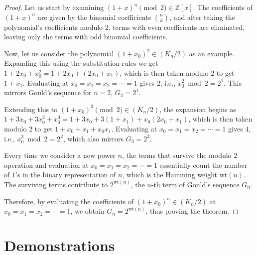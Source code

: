 \documentclass{article}
\theoremstyle{plain}
\theoremstyle{definition}
\newcommand{\Z}{\mathbb{Z}}
\newcommand{\K}{K}
\newcommand{\wt}[1]{\text{wt}(#1)}
\begin{document}
\begin{proof}
Let us start by examining $ (1+x)^n \pmod{2} \in \Z[x]$. The coefficients of $(1+x)^n$ are given by the binomial coefficients $\binom{n}{k}$, and after taking the polynomial's coefficients modulo $2$, terms with even coefficients are eliminated, leaving only the terms with odd binomial coefficients.

Now, let us consider the polynomial $(1+x_0)^2 \in (\K_n/2)$ as an example. Expanding this using the substitution rules we get $1 + 2x_0 + x_0^2 = 1 + 2x_0 + (2x_0 + x_1)$, which is then taken modulo $2$ to get $1 + x_1$. Evaluating at $x_0=x_1=x_2=\cdots=1$ gives $2$, i.e., $x_0^2 \bmod 2 = 2^1$. This mirrors Gould's sequence for $n = 2$, $G_2 = 2^1$.

Extending this to $(1+x_0)^3 \pmod{2} \in (\K_n/2)$, the expansion begins as $1 + 3x_0 + 3x_0^2 + x_0^3 = 1 + 3x_0 + 3(1+x_1) + x_0(2x_0+x_1)$, which is then taken modulo $2$ to get $1 + x_0 + x_1 + x_0 x_1$. Evaluating at $x_0=x_1=x_2=\cdots=1$ gives $4$, i.e., $x_0^3 \bmod 2 = 2^2$, which also mirrors $G_3 = 2^2$.

Every time we consider a new power $n$, the terms that survive the modulo $2$ operation and evaluation at $x_0=x_1=x_2=\cdots=1$ essentially count the number of $1$'s in the binary representation of $n$, which is the Hamming weight $\wt{n}$. The surviving terms contribute to $2^{\wt{n}}$, the $n$-th term of Gould's sequence $G_n$.

Therefore, by evaluating the coefficients of $(1+x_0)^n \in (\K_n/2)$ at $x_0=x_1=x_2=\cdots=1$, we obtain $G_n = 2^{\wt{n}}$, thus proving the theorem.
\end{proof}

\section{Demonstrations}
\end{document}
